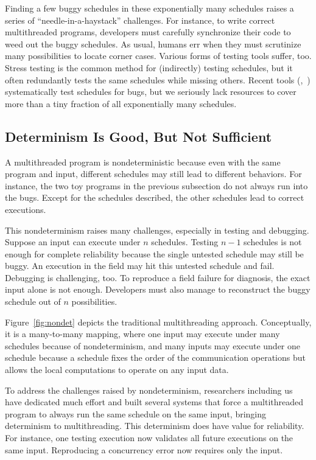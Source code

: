 Finding a few buggy schedules in these exponentially many schedules raises
a series of ``needle-in-a-haystack'' challenges.  For instance, to write
correct multithreaded programs, developers must carefully synchronize
their code to weed out the buggy schedules.  As usual, humans err when
they must scrutinize many possibilities to locate corner cases. Various
forms of testing tools suffer, too.  Stress testing is the common method
for (indirectly) testing schedules, but it often redundantly tests the
same schedules while missing others.  Recent tools
(\eg,~\cite{musuvathi:chess:osdi08}) systematically test schedules for bugs, but
we seriously lack resources to cover more than a tiny fraction of all
exponentially many schedules.

\subsection{Determinism Is Good, But Not Sufficient} \label{sec:smt-nondet}

A multithreaded program is nondeterministic because even with the same
program and input, different schedules may still lead to different
behaviors.  For instance, the two toy programs in the previous subsection
do not always run into the bugs.  Except for the schedules described, the
other schedules lead to correct executions.

This nondeterminism raises many challenges, especially in
testing and debugging.  Suppose an input can execute under $n$ schedules.
Testing $n-1$ schedules is not enough for complete reliability because the
single untested schedule may still be buggy.  An execution in the field
may hit this untested schedule and fail.  Debugging is challenging, too.
To reproduce a field failure for diagnosis, the exact input alone is not
enough. Developers must also manage to reconstruct the buggy schedule out
of $n$ possibilities.

Figure~\ref{fig:nondet} depicts the traditional multithreading approach.
Conceptually, it is a many-to-many mapping, where one input may execute
under many schedules because of nondeterminism, and many inputs may
execute under one schedule because a schedule fixes the order of the
communication operations but allows the local computations to operate on
any input data.


To address the challenges raised by nondeterminism, researchers including
us have dedicated much effort and built several systems that force a
multithreaded program to always run the same schedule on the same input,
bringing determinism to multithreading.  This determinism does have value
for reliability.  For instance, one testing execution now validates all
future executions on the same input.  Reproducing a concurrency error now
requires only the input.

